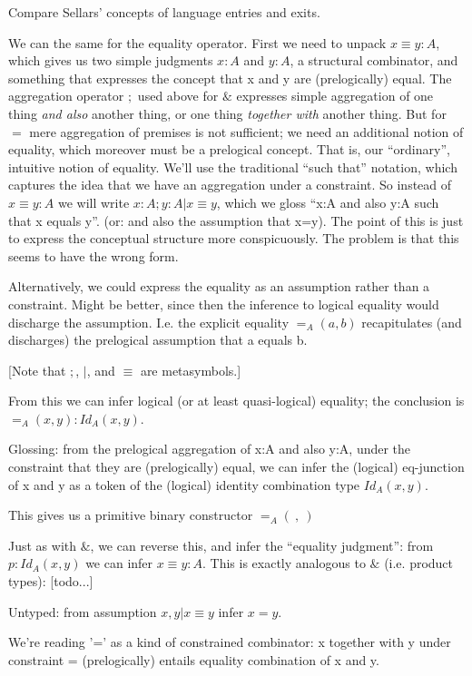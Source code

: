 \documentclass{article}
\begin{document}
Compare Sellars' concepts of language entries and exits.

We can the same for the equality operator. First we need to unpack \(x
≡ y : A\), which gives us two simple judgments \(x:A\) and \(y:A\), a
structural combinator, and something that expresses the concept that x
and y are (prelogically) equal. The aggregation operator \(;\) used
above for \(\&\) expresses simple aggregation of one thing \textit{and
  also} another thing, or one thing \textit{together with} another thing.
But for \(=\) mere aggregation of premises is not sufficient; we need
an additional notion of equality, which moreover must be a prelogical
concept. That is, our ``ordinary'', intuitive notion of equality.
We'll use the traditional ``such that'' notation, which captures the
idea that we have an aggregation under a constraint. So instead of \(x
≡ y : A\) we will write \(x:A ; y:A | x≡y\), which we gloss ``x:A and
also y:A such that x equals y''. (or: and also the assumption that
x=y). The point of this is just to express the conceptual structure
more conspicuously. The problem is that this seems to have the wrong
form.

Alternatively, we could express the equality as an assumption rather
than a constraint. Might be better, since then the inference to
logical equality would discharge the assumption. I.e. the explicit
equality \( =_A(a,b) \) recapitulates (and discharges) the prelogical
assumption that a equals b.

[Note that \(;\), \(|\), and \(≡\) are metasymbols.]

From this we can infer logical (or at least quasi-logical) equality;
the conclusion is \( =_A(x,y) : Id_A(x,y) \).

Glossing: from the prelogical aggregation of x:A and also y:A, under
the constraint that they are (prelogically) equal, we can infer the
(logical) eq-junction of x and y as a token of the (logical) identity
combination type \(Id_A(x,y)\).

This gives us a primitive binary constructor \( =_A(\ ,\ ) \)

Just as with \(\&\), we can reverse this, and infer the ``equality
judgment'': from \( p: Id_A(x,y) \) we can infer \(x ≡ y : A\). This
is exactly analogous to \(\&\) (i.e. product types): [todo...]

Untyped:  from assumption \(x, y | x≡y \) infer \(x = y\).

We're reading '=' as a kind of constrained combinator: x together with
y under constraint = (prelogically) entails equality combination of x
and y.
\end{document}
